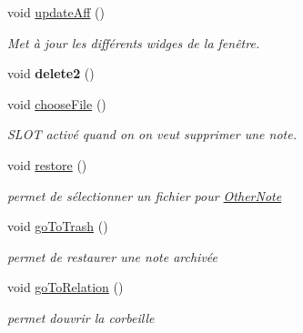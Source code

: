 \begin{DoxyCompactItemize}
\mbox{\label{classMainWindow_ae70f95ed37a4eaf8bc0c20b3c316d234}} 
void \hyperlink{classMainWindow_ae70f95ed37a4eaf8bc0c20b3c316d234}{update\+Aff} ()
\begin{DoxyCompactList}\small\item\em Met à jour les différents widges de la fenêtre. \end{DoxyCompactList}\item 
\mbox{\label{classMainWindow_a2562c05eaca016e6e195d75fd6e3ad22}} 
void {\bfseries delete2} ()
\item 
\mbox{\label{classMainWindow_ad9414920d90d79a159c013deb5adbfbe}} 
void \hyperlink{classMainWindow_ad9414920d90d79a159c013deb5adbfbe}{choose\+File} ()
\begin{DoxyCompactList}\small\item\em S\+L\+OT activé quand on on veut supprimer une note. \end{DoxyCompactList}\item 
\mbox{\label{classMainWindow_acdc8ce6bfc3a9ea7d724e99563d1822e}} 
void \hyperlink{classMainWindow_acdc8ce6bfc3a9ea7d724e99563d1822e}{restore} ()
\begin{DoxyCompactList}\small\item\em permet de sélectionner un fichier pour \hyperlink{classOtherNote}{Other\+Note} \end{DoxyCompactList}\item 
\mbox{\label{classMainWindow_a26578fda936961697c19bd77212d3197}} 
void \hyperlink{classMainWindow_a26578fda936961697c19bd77212d3197}{go\+To\+Trash} ()
\begin{DoxyCompactList}\small\item\em permet de restaurer une note archivée \end{DoxyCompactList}\item 
\mbox{\label{classMainWindow_afaac38f937603bdad968530f853e800e}} 
void \hyperlink{classMainWindow_afaac38f937603bdad968530f853e800e}{go\+To\+Relation} ()
\begin{DoxyCompactList}\small\item\em permet d\textquotesingle{}ouvrir la corbeille \end{DoxyCompactList}\item 

\end{DoxyCompactItemize}
